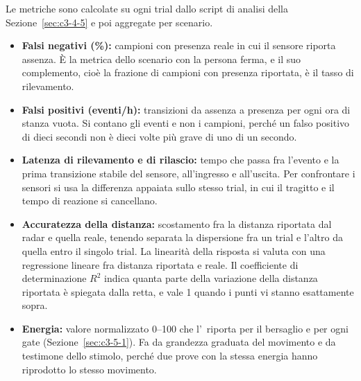 Le metriche sono calcolate su ogni trial dallo script di analisi della
Sezione~\ref{sec:c3-4-5} e poi aggregate per scenario.
\begin{itemize}
  \item \textbf{Falsi negativi (\%):} campioni con presenza reale in cui il sensore riporta
    assenza. È la metrica dello scenario con la persona ferma, e il suo complemento, cioè
    la frazione di campioni con presenza riportata, è il tasso di rilevamento.
  \item \textbf{Falsi positivi (eventi/h):} transizioni da assenza a presenza per ogni ora
    di stanza vuota. Si contano gli eventi e non i campioni, perché un falso positivo di
    dieci secondi non è dieci volte più grave di uno di un secondo.
  \item \textbf{Latenza di rilevamento e di rilascio:} tempo che passa fra l'evento e la
    prima transizione stabile del sensore, all'ingresso e all'uscita. Per confrontare i
    sensori si usa la differenza appaiata sullo stesso trial, in cui il tragitto e il
    tempo di reazione si cancellano.
  \item \textbf{Accuratezza della distanza:} scostamento fra la distanza riportata dal
    radar e quella reale, tenendo separata la dispersione fra un trial e l'altro da quella
    entro il singolo trial. La linearità della risposta si valuta con una regressione lineare fra distanza riportata e reale. Il coefficiente di determinazione $R^2$ indica quanta parte della variazione della distanza riportata è spiegata dalla retta, e vale 1 quando i punti vi stanno esattamente sopra.
  \item \textbf{Energia:} valore normalizzato 0--100 che l'\ldb\ riporta per il bersaglio e
    per ogni gate (Sezione~\ref{sec:c3-5-1}). Fa da grandezza graduata del movimento e da
    testimone dello stimolo, perché due prove con la stessa energia hanno riprodotto lo
    stesso movimento.
\end{itemize}

